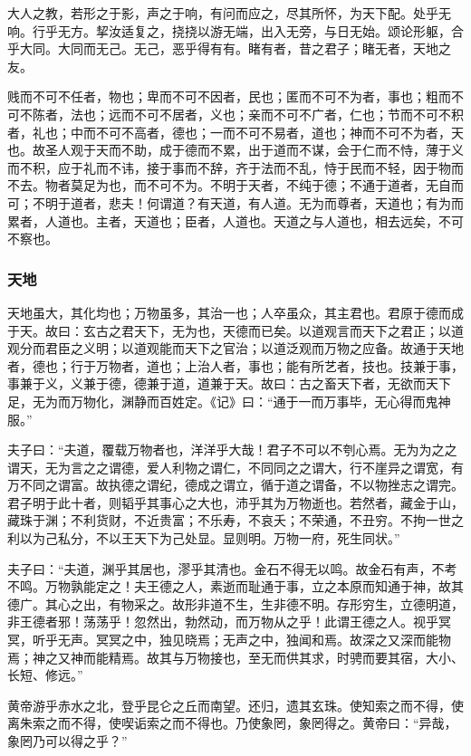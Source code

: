 \documentclass[]{article}
\begin{document}
大人之教，若形之于影，声之于响，有问而应之，尽其所怀，为天下配。处乎无响。行乎无方。挈汝适复之，挠挠以游无端，出入无旁，与日无始。颂论形躯，合乎大同。大同而无己。无己，恶乎得有有。睹有者，昔之君子；睹无者，天地之友。

贱而不可不任者，物也；卑而不可不因者，民也；匿而不可不为者，事也；粗而不可不陈者，法也；远而不可不居者，义也；亲而不可不广者，仁也；节而不可不积者，礼也；中而不可不高者，德也；一而不可不易者，道也；神而不可不为者，天也。故圣人观于天而不助，成于德而不累，出于道而不谋，会于仁而不恃，薄于义而不积，应于礼而不讳，接于事而不辞，齐于法而不乱，恃于民而不轻，因于物而不去。物者莫足为也，而不可不为。不明于天者，不纯于德；不通于道者，无自而可；不明于道者，悲夫！何谓道？有天道，有人道。无为而尊者，天道也；有为而累者，人道也。主者，天道也；臣者，人道也。天道之与人道也，相去远矣，不可不察也。

\hypertarget{header-n229}{%
\subsubsection{天地}\label{header-n229}}

天地虽大，其化均也；万物虽多，其治一也；人卒虽众，其主君也。君原于德而成于天。故曰：玄古之君天下，无为也，天德而已矣。以道观言而天下之君正；以道观分而君臣之义明；以道观能而天下之官治；以道泛观而万物之应备。故通于天地者，德也；行于万物者，道也；上治人者，事也；能有所艺者，技也。技兼于事，事兼于义，义兼于德，德兼于道，道兼于天。故曰：古之畜天下者，无欲而天下足，无为而万物化，渊静而百姓定。《记》曰：``通于一而万事毕，无心得而鬼神服。''

夫子曰：``夫道，覆载万物者也，洋洋乎大哉！君子不可以不刳心焉。无为为之之谓天，无为言之之谓德，爱人利物之谓仁，不同同之之谓大，行不崖异之谓宽，有万不同之谓富。故执德之谓纪，德成之谓立，循于道之谓备，不以物挫志之谓完。君子明于此十者，则韬乎其事心之大也，沛乎其为万物逝也。若然者，藏金于山，藏珠于渊；不利货财，不近贵富；不乐寿，不哀夭；不荣通，不丑穷。不拘一世之利以为己私分，不以王天下为己处显。显则明。万物一府，死生同状。''

夫子曰：``夫道，渊乎其居也，漻乎其清也。金石不得无以鸣。故金石有声，不考不鸣。万物孰能定之！夫王德之人，素逝而耻通于事，立之本原而知通于神，故其德广。其心之出，有物采之。故形非道不生，生非德不明。存形穷生，立德明道，非王德者邪！荡荡乎！忽然出，勃然动，而万物从之乎！此谓王德之人。视乎冥冥，听乎无声。冥冥之中，独见晓焉；无声之中，独闻和焉。故深之又深而能物焉；神之又神而能精焉。故其与万物接也，至无而供其求，时骋而要其宿，大小、长短、修远。''

黄帝游乎赤水之北，登乎昆仑之丘而南望。还归，遗其玄珠。使知索之而不得，使离朱索之而不得，使喫诟索之而不得也。乃使象罔，象罔得之。黄帝曰：``异哉，象罔乃可以得之乎？''
\end{document}
